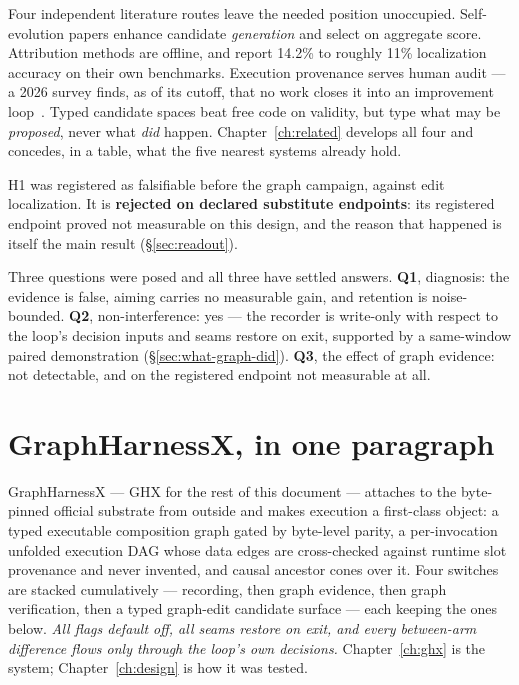 Four independent literature routes leave the needed position unoccupied.
Self-evolution papers enhance candidate \emph{generation} and select on
aggregate score. Attribution methods are offline, and report 14.2\% to
roughly 11\% localization accuracy on their own benchmarks. Execution
provenance serves human audit --- a 2026 survey finds, as of its cutoff,
that no work closes it into an improvement loop~\cite{survey-provenance}.
Typed candidate spaces beat free code on validity, but type what may be
\emph{proposed}, never what \emph{did} happen. Chapter~\ref{ch:related}
develops all four and concedes, in a table, what the five nearest systems
already hold.

H1 was registered as falsifiable before the graph campaign, against edit
localization. It is \textbf{rejected on declared substitute endpoints}: its
registered endpoint proved not measurable on this design, and the reason
that happened is itself the main result (\S\ref{sec:readout}).

Three questions were posed and all three have settled answers. \textbf{Q1},
diagnosis: the evidence is false, aiming carries no measurable gain, and
retention is noise-bounded. \textbf{Q2}, non-interference: yes --- the
recorder is write-only with respect to the loop's decision inputs and seams
restore on exit, supported by a same-window paired demonstration
(\S\ref{sec:what-graph-did}). \textbf{Q3}, the effect of graph evidence:
not detectable, and on the registered endpoint not measurable at all.

\section{GraphHarnessX, in one paragraph}
\label{sec:ghx-preview}

GraphHarnessX --- GHX for the rest of this document --- attaches to the
byte-pinned official substrate from outside and makes
execution a first-class object: a typed executable composition graph gated
by byte-level parity, a per-invocation unfolded execution DAG whose data
edges are cross-checked against runtime slot provenance and never invented,
and causal ancestor cones over it. Four switches are stacked cumulatively
--- recording, then graph evidence, then graph verification, then a typed
graph-edit candidate surface --- each keeping the ones below.
\emph{All flags default off, all seams restore on exit, and every
between-arm difference flows only through the loop's own decisions.}
Chapter~\ref{ch:ghx} is the system; Chapter~\ref{ch:design} is how it was
tested.

